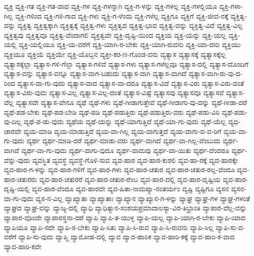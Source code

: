 {ವ್ಯಕ್ತಿ
ವ್ಯಕ್ತಿ-ಗತ
ವ್ಯಕ್ತಿ-ಗತ-ವಾದ
ವ್ಯಕ್ತಿ-ಗಳ
ವ್ಯಕ್ತಿ-ಗಳನ್ನಾಗಿ
ವ್ಯಕ್ತಿ-ಗ-ಳನ್ನು
ವ್ಯಕ್ತಿ-ಗಳಲ್ಲ
ವ್ಯಕ್ತಿ-ಗಳಲ್ಲಿಯೂ
ವ್ಯಕ್ತಿ-ಗಳಾ-ಗಿಲ್ಲ
ವ್ಯಕ್ತಿ-ಗಳಿಂದ
ವ್ಯಕ್ತಿ-ಗಳಿ-ಗಾದ
ವ್ಯಕ್ತಿ-ಗಳು
ವ್ಯಕ್ತಿ-ಗ-ಳೆಂದು
ವ್ಯಕ್ತಿ-ಗಳೆಲ್ಲ
ವ್ಯಕ್ತಿಗೂ
ವ್ಯಕ್ತಿಗೆ
ವ್ಯಕ್ತಿ-ಜೀವ-ನಕ್ಕೆ
ವ್ಯಕ್ತಿತ್ವ-ವನ್ನು
ವ್ಯಕ್ತಿತ್ವ
ವ್ಯಕ್ತಿತ್ವಕ್ಕಾಗಿ
ವ್ಯಕ್ತಿತ್ವಕ್ಕೆ
ವ್ಯಕ್ತಿತ್ವ-ಗಳು
ವ್ಯಕ್ತಿತ್ವದ
ವ್ಯಕ್ತಿತ್ವ-ಭಾವ
ವ್ಯಕ್ತಿತ್ವ-ವನ್ನು
ವ್ಯಕ್ತಿತ್ವ-ವಿದೆ
ವ್ಯಕ್ತಿತ್ವ-ವಿಲ್ಲ
ವ್ಯಕ್ತಿತ್ವವು
ವ್ಯಕ್ತಿತ್ವವೂ
ವ್ಯಕ್ತಿತ್ವ-ವೆಂದಾಗಲಿ
ವ್ಯಕ್ತಿತ್ವವೇ
ವ್ಯಕ್ತಿ-ದೃಷ್ಟಿ-ಯಿಂದ
ವ್ಯಕ್ತಿಯ
ವ್ಯಕ್ತಿ-ಯನ್ನು
ವ್ಯಕ್ತಿ-ಯಲ್ಲ
ವ್ಯಕ್ತಿ-ಯಲ್ಲಿ
ವ್ಯಕ್ತಿ-ಯಲ್ಲಿಯೂ
ವ್ಯಕ್ತಿ-ಯ-ವರೆಗೆ
ವ್ಯಕ್ತಿ-ಯಾಗಿ-ರ-ಬೇಕು
ವ್ಯಕ್ತಿ-ಯಾಗಿ-ರುವನು
ವ್ಯಕ್ತಿ-ಯಾ-ದನು
ವ್ಯಕ್ತಿಯು
ವ್ಯಕ್ತಿಯೂ
ವ್ಯಕ್ತಿಯೆ
ವ್ಯಕ್ತಿಯೇ
ವ್ಯಕ್ತಿ-ಯೊಬ್ಬನ
ವ್ಯಕ್ತೀ-ಕರ-ಣ-ಗೊಂಡ-ವನು
ವ್ಯತ್ಯಾಸ
ವ್ಯತ್ಯಾಸಕ್ಕೆ
ವ್ಯತ್ಯಾಸಕ್ಕೆಲ್ಲ
ವ್ಯತ್ಯಾಸಕ್ಕೆಲ್ಲಾ
ವ್ಯತ್ಯಾಸ-ಗಳಿ-ಗೆಲ್ಲಾ
ವ್ಯತ್ಯಾಸ-ಗಳಿವೆ
ವ್ಯತ್ಯಾಸ-ಗಳು
ವ್ಯತ್ಯಾಸ-ಗಳೆಲ್ಲವೂ
ವ್ಯತ್ಯಾಸ-ದಲ್ಲಿ
ವ್ಯತ್ಯಾಸ-ದೊಂದಿಗೆ
ವ್ಯತ್ಯಾಸ-ವನ್ನು
ವ್ಯತ್ಯಾಸ-ವನ್ನೂ
ವ್ಯತ್ಯಾಸ-ವಾಗ-ಬಹುದು
ವ್ಯತ್ಯಾಸ-ವಾಗಿ
ವ್ಯತ್ಯಾಸ-ವಾಗಿದೆ
ವ್ಯತ್ಯಾಸ-ವಾಗಿ-ರು-ವು-ದ-ರಿಂದ
ವ್ಯತ್ಯಾಸ-ವಾ-ಗು-ವುದು
ವ್ಯತ್ಯಾಸ-ವಾದ
ವ್ಯತ್ಯಾಸ-ವಾ-ದರೂ
ವ್ಯತ್ಯಾಸ-ವಿದೆ
ವ್ಯತ್ಯಾಸ-ವಿರು
ವ್ಯತ್ಯಾಸ-ವಿರು-ವಂತೆ
ವ್ಯತ್ಯಾಸ-ವಿರು-ವುದು
ವ್ಯತ್ಯಾಸ-ವಿಲ್ಲ
ವ್ಯತ್ಯಾಸ-ವಿಲ್ಲ-ದಂತೆ
ವ್ಯತ್ಯಾಸ-ವಿಷ್ಟೆ
ವ್ಯತ್ಯಾಸವು
ವ್ಯತ್ಯಾಸವೂ
ವ್ಯತ್ಯಾಸವೆ
ವ್ಯತ್ಯಾಸ-ವೆಲ್ಲ
ವ್ಯತ್ಯಾಸವೇ
ವ್ಯತ್ಯಾಸ-ವೇನೂ
ವ್ಯಥೆ
ವ್ಯಥೆ-ಗಳು
ವ್ಯಥೆ-ಗೀಡಾಗುತ್ತೇವೆ
ವ್ಯಥೆ-ಗೀಡಾಗು-ವು-ದನ್ನು
ವ್ಯಥೆ-ಗೀಡಾ-ದರೆ
ವ್ಯಥೆ-ಪಡ-ಬೇಕು
ವ್ಯಥೆ-ಪಡ-ಬೇಡಿ
ವ್ಯಥೆ-ಪಡಿ
ವ್ಯಥೆ-ಪಡುತ್ತಿರು
ವ್ಯಥೆ-ಪಡುತ್ತಿರು-ವರು
ವ್ಯಥೆ-ಪಡು-ವಿರಿ
ವ್ಯಥೆ-ಪಡು-ವು-ದಿಲ್ಲ
ವ್ಯಥೆ-ಪ-ಡು-ವುದು
ವ್ಯಥೆಯ
ವ್ಯಥೆ-ಯನ್ನು
ವ್ಯಥೆ-ಯಾಗುತ್ತಿದೆ
ವ್ಯಥೆ-ಯಾ-ಗು-ವುದು
ವ್ಯಥೆ-ಯೆಲ್ಲ
ವ್ಯಭಿ-ಚಾರವೇ
ವ್ಯಯ-ಮಾಡಿ
ವ್ಯಯ-ಮಾಡುತ್ತಿದೆ
ವ್ಯಯ-ವಾ-ಗಿಲ್ಲ
ವ್ಯಯ-ವಾಗುತ್ತದೆ
ವ್ಯಯ-ವಾಗು-ವ-ವ-ರಿಗೆ
ವ್ಯಯ-ವಾ-ಗು-ವುದು
ವ್ಯರ್ಥ
ವ್ಯರ್ಥ-ಮಾಡಿ-ದರೆ
ವ್ಯರ್ಥ-ಮಾಡು-ವರು
ವ್ಯರ್ಥ-ವಾಗಿದೆ
ವ್ಯರ್ಥ-ವಾ-ಗಿಲ್ಲ-ವೆಂಬುದು
ವ್ಯರ್ಥ-ವಾಗಿವೆ
ವ್ಯರ್ಥ-ವಾ-ಗು-ವುದು
ವ್ಯರ್ಥ-ವಾಗು-ವುದೂ
ವ್ಯರ್ಥ-ವಾದುವು
ವ್ಯರ್ಥ-ವಾ-ಯಿತು
ವ್ಯರ್ಥ-ವೆಂದರೂ
ವ್ಯರ್ಥ-ವೆನ್ನು-ವುದು
ವ್ಯವಸ್ಥಿತ
ವ್ಯವಸ್ಥೆ
ವ್ಯವಸ್ಥೆ-ಗೊಳಿ-ಸುವ
ವ್ಯವ-ಹಾರ
ವ್ಯವ-ಹಾರ-ಕುಶಲಿ
ವ್ಯವ-ಹಾ-ರಕ್ಕೆ
ವ್ಯವ-ಹಾರಕ್ಕೇ
ವ್ಯವ-ಹಾರ-ಗ-ಳನ್ನು
ವ್ಯವ-ಹಾರ-ಗಳಿಗೆ
ವ್ಯವ-ಹಾರ-ಗಳು
ವ್ಯವ-ಹಾರ-ಚತುರ
ವ್ಯವ-ಹಾರ-ಚತುರ-ರಲ್ಲ-ವೆಂದೂ
ವ್ಯವ-ಹಾರ-ಚತುರರು
ವ್ಯವ-ಹಾರ-ಚತುರರೆ
ವ್ಯವ-ಹಾರ-ಚತುರ-ರೆಂಬ
ವ್ಯವ-ಹಾರ-ದಲ್ಲಿ
ವ್ಯವ-ಹಾರ-ದೃಷ್ಟಿಯ
ವ್ಯವ-ಹಾರ-ದೃಷ್ಟಿ-ಯಲ್ಲಿ
ವ್ಯವ-ಹಾರ-ವೆಂದೂ
ವ್ಯವ-ಹಾರವೇ
ವ್ಯವ-ಹಿತಾ-ನಾಮಪ್ಯಾ-ನಂತರ್ಯಂ
ವ್ಯಷ್ಟಿ
ವ್ಯಷ್ಟಿಗೂ
ವ್ಯಸನ
ವ್ಯಸನ-ವಾ-ಗು-ವುದು
ವ್ಯಸ-ನ-ವಿಲ್ಲ
ವ್ಯಾಖ್ಯಾತಾ
ವ್ಯಾಖ್ಯಾತಾಃ
ವ್ಯಾಖ್ಯಾನ
ವ್ಯಾಖ್ಯಾನ-ಗ-ಳನ್ನು
ವ್ಯಾಘ್ರ
ವ್ಯಾಘ್ರ-ಗಳ
ವ್ಯಾಘ್ರ-ಗಳಂತೆ
ವ್ಯಾಘ್ರದ
ವ್ಯಾಘ್ರ-ವನ್ನು
ವ್ಯಾಜ್ಯ-ದಲ್ಲಿ
ವ್ಯಾಧಿ
ವ್ಯಾಧಿತ್ಯಾನ-ಸಂಶಯಪ್ರಮಾದಾಲಸ್ಯಾ-ವಿರ-ತಿಭ್ರಾಂತಿ
ವ್ಯಾಪಾರ-ವೆಲ್ಲ-ವನ್ನು
ವ್ಯಾಪಾರ-ವೊಂದೇ
ವ್ಯಾಪಾರಸ್ಥನಾ-ದರೆ
ವ್ಯಾಪಿ
ವ್ಯಾಪಿ-ತ-ಯುಳ್ಳ
ವ್ಯಾಪಿ-ಯಲ್ಲ
ವ್ಯಾಪಿ-ಯಾಗಿ-ರ-ಬೇಕು
ವ್ಯಾಪಿ-ಯಾದ
ವ್ಯಾಪಿಯೂ
ವ್ಯಾಪಿ-ಸದೇ
ವ್ಯಾಪಿ-ಸ-ಬೇಕು
ವ್ಯಾಪಿ-ಸಿತು
ವ್ಯಾಪಿ-ಸಿ-ರುವ
ವ್ಯಾಪಿ-ಸಿ-ರುವನು
ವ್ಯಾಪಿ-ಸಿಲ್ಲ
ವ್ಯಾಪಿ-ಸು-ವ-ವರೆಗೆ
ವ್ಯಾಪಿ-ಸು-ವುದು
ವ್ಯಾಪ್ತಿ
ವ್ಯಾಮೋಹ-ದಲ್ಲಿ
ವ್ಯಾವ
ವ್ಯಾವ-ಹಾರಿಕ
ವ್ಯಾವ-ಹಾರಿ-ಕಕ್ಕೆ
ವ್ಯಾವ-ಹಾರಿ-ಕ-ವಾದ
ವ್ಯಾವ-ಹಾರಿ-ಕವೇ
}
